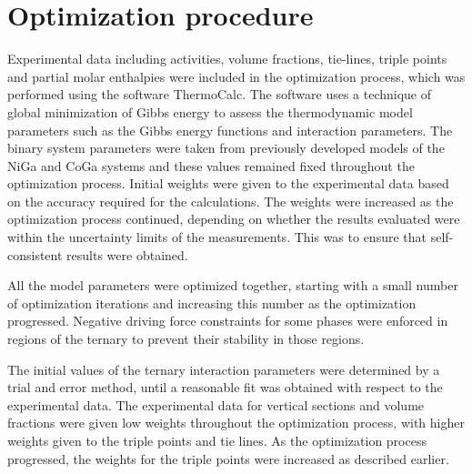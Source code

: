 \documentclass[article]{elsarticle}
\begin{document}
\section{Optimization procedure}
\label{Modeling}
Experimental data including activities, volume fractions, tie-lines, triple points and
partial molar enthalpies \cite{Oik06,Duch08,Oik01,Liu06,Mik87}
were included in the optimization process, which was performed using the software
ThermoCalc. The software uses a technique of global minimization of Gibbs energy to assess
the thermodynamic model parameters such as the Gibbs energy functions
and interaction parameters. The binary
system parameters were taken from previously developed models of the NiGa and CoGa systems \cite{Ipser04,Cha10}
and these values remained fixed throughout the optimization process.
Initial weights were given to the experimental data based on the accuracy
required for the calculations. The weights were increased as the
optimization process continued, depending on whether the results evaluated were within the
uncertainty limits of the measurements. This was to ensure that self-consistent results
were obtained.

All the model parameters were optimized together, starting with a small number of
optimization iterations and increasing this number as the optimization
progressed. Negative driving force constraints for some phases were enforced
in regions of the ternary to prevent their stability in those regions.

The initial values of the ternary interaction parameters were determined by a trial
and error method, until a reasonable fit was obtained with respect to the experimental
data. The experimental data for vertical sections and volume fractions were given
low weights throughout the optimization process, with higher weights given to
the triple points and tie lines. As the optimization process progressed, the weights for
the triple points were increased as described earlier.
\end{document}

